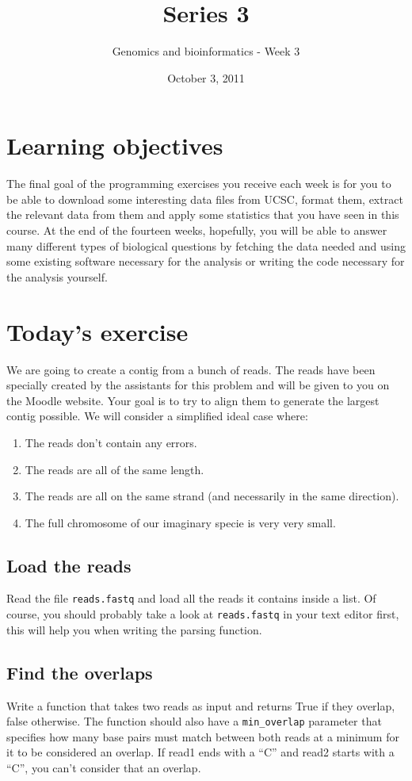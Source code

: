 \documentclass[a4paper,11pt]{article}
\title{Series 3}
\date{October 3, 2011}
\author{Genomics and bioinformatics - Week 3}
\begin{document}
\maketitle

\section{Learning objectives}
The final goal of the programming exercises you receive each week is for you to be able to download some interesting data files from UCSC, format them, extract the relevant data from them and apply some statistics that you have seen in this course. At the end of the fourteen weeks, hopefully, you will be able to answer many different types of biological questions by fetching the data needed and using some existing software necessary for the analysis or writing the code necessary for the analysis yourself.

\section{Today's exercise}
We are going to create a contig from a bunch of reads. The reads have been specially created by the assistants for this problem and will be given to you on the Moodle website. Your goal is to try to align them to generate the largest contig possible. We will consider a simplified ideal case where:
\begin{enumerate}
\item The reads don't contain any errors.
\item The reads are all of the same length.
\item The reads are all on the same strand (and necessarily in the same direction).
\item The full chromosome of our imaginary specie is very very small.
\end{enumerate}
\subsection{Load the reads}
Read the file \texttt{reads.fastq} and load all the reads it contains inside a list. Of course, you should probably take a look at \texttt{reads.fastq} in your text editor first, this will help you when writing the parsing function.
\subsection{Find the overlaps}
Write a function that takes two reads as input and returns True if they overlap, false otherwise. The function should also have a \texttt{min\_overlap} parameter that specifies how many base pairs must match between both reads at a minimum for it to be considered an overlap. If read1 ends with a ``C'' and read2 starts with a ``C'', you can't consider that an overlap.
\end{document}
